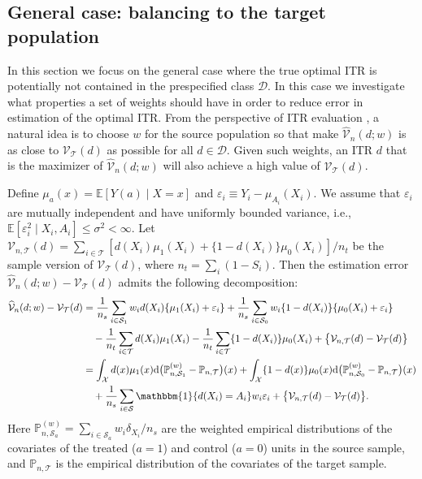\documentclass[12pt]{article}
\newcommand{\E}{\mathbb{E}}
\newcommand{\prob}{\mathbb{P}}
\newcommand{\ind}{\mathbbm{1}}
\begin{document}
\subsection{General case: balancing to the target population}
\label{sec:bal_to_target}

In this section we focus on the general case where the true optimal ITR is potentially not contained in the prespecified class $\mathcal{D}$. In this case we investigate what properties a set of weights should have in order to reduce error in estimation of the optimal ITR.
From the perspective of ITR evaluation \citep{kallus2018balanced}, a natural idea is to choose $w$ for the source population so that make $\widehat{\mathcal{V}}_n(d; w)$ is as close to $\mathcal{V}_\mathcal{T}(d)$ as possible for all $d \in \mathcal{D}$. Given such weights, an ITR $d$ that is the maximizer of $\widehat{\mathcal{V}}_n(d; w)$ will also achieve a high value of $\mathcal{V}_\mathcal{T}(d)$.

Define $\mu_a(x) = \E[Y(a) \mid X = x]$ and $\varepsilon_i \equiv Y_i - \mu_{A_i}(X_i)$. We assume that $\varepsilon_i$ are mutually independent and have uniformly bounded variance, i.e., $\E[\varepsilon_i^2 \mid X_i, A_i] \le \sigma^2 < \infty$. Let $\mathcal{V}_{n,\mathcal{T}}(d) = \sum_{i \in \mathcal{T}} [d(X_i) \mu_1(X_i) + \{ 1 - d(X_i) \} \mu_0(X_i) ]/ n_t$ be the sample version of $\mathcal{V}_\mathcal{T}(d)$, where $n_t = \sum_i (1 - S_i)$. Then the estimation error $\widehat{\mathcal{V}}_n(d; w) - \mathcal{V}_\mathcal{T}(d)$ admits the following decomposition:
\begin{equation}
   \label{eq:err_decomp_s_t}
    \begin{aligned} 
        \widehat{\mathcal{V}}_n(d; w) - \mathcal{V}_\mathcal{T}(d)
        &=
        \frac{1}{n_s} \sum_{i \in \mathcal{S}_1} w_i d(X_i) \{ \mu_1(X_i) + \varepsilon_i \} +
        \frac{1}{n_s} \sum_{i \in \mathcal{S}_0} w_i \{ 1-d(X_i) \} \{ \mu_0(X_i) + \varepsilon_i \}
        \\&\quad -
        \frac{1}{n_t} \sum_{i \in \mathcal{T}} d(X_i) \mu_1(X_i) -
        \frac{1}{n_t} \sum_{i \in \mathcal{T}} \{ 1 - d(X_i) \} \mu_0(X_i) +
        \big\{ \mathcal{V}_{n,\mathcal{T}}(d) - \mathcal{V}_\mathcal{T}(d) \big\}
        \\&=
        \int_\mathcal{X} d(x) \mu_1(x) \textnormal{d} \big( \prob_{n,\mathcal{S}_1}^{(w)} - \prob_{n,\mathcal{T}}\big)(x) + 
        \int_\mathcal{X} \{ 1-d(x) \} \mu_0(x) \textnormal{d} \big( \prob_{n,\mathcal{S}_0}^{(w)} - \prob_{n,\mathcal{T}}\big)(x)
        \\&\quad +
        \frac{1}{n_s}\sum_{i \in \mathcal{S}} \ind \{ d(X_i)=A_i \} w_i \varepsilon_i +
        \big\{ \mathcal{V}_{n,\mathcal{T}}(d) - \mathcal{V}_\mathcal{T}(d) \big\}  
    .\end{aligned}
\end{equation}
Here $\prob_{n,\mathcal{S}_a}^{(w)} = \sum_{i \in \mathcal{S}_a} w_i \delta_{X_i}/ n_s$ are the weighted empirical distributions of the covariates of the treated ($a=1$) and control ($a=0$) units in the source sample, and $\prob_{n,\mathcal{T}}$ is the empirical distribution of the covariates of the target sample. 
\end{document}
